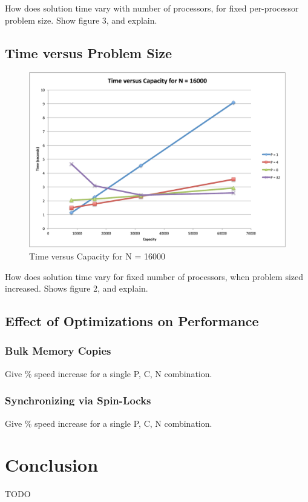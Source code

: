 \documentclass[11pt]{article} %
\begin{document}
How does solution time vary with number of processors, for fixed per-processor problem size. Show figure 3, and explain.

\subsection{Time versus Problem Size}

\begin{figure}
\begin{centering}
\includegraphics[width=0.5\paperwidth]{figures/TvsC.pdf}
\caption{Time versus Capacity for N = 16000}
\label{TvsC}
\end{centering}
\end{figure}

How does solution time vary for fixed number of processors, when problem sized increased. Shows figure 2, and explain.

\subsection{Effect of Optimizations on Performance}

\subsubsection{Bulk Memory Copies}

Give \% speed increase for a single P, C, N combination.

\subsubsection{Synchronizing via Spin-Locks}

Give \% speed increase for a single P, C, N combination.

\section{Conclusion}

TODO
\end{document}
